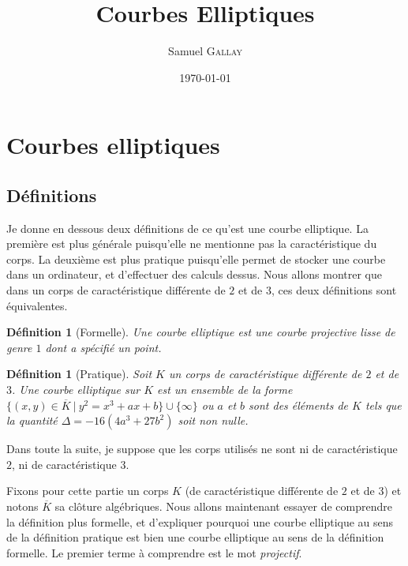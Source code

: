 \documentclass{article}
\title{Courbes Elliptiques}
\author{Samuel \textsc{Gallay}}
\date{\today}
\theoremstyle{plain}%
\newtheorem{deff}[thm]{Définition}
\theoremstyle{definition}%
\newcommand{\ol}{\overline}
\begin{document}
\maketitle





\section{Courbes elliptiques}

\subsection{Définitions}

Je donne en dessous deux définitions de ce qu'est une courbe elliptique. La première est plus générale puisqu'elle ne mentionne pas la  caractéristique du corps. La deuxième est plus pratique puisqu'elle permet de stocker une courbe dans un ordinateur, et d'effectuer des calculs dessus. Nous allons montrer que dans un corps de caractéristique différente de $2$ et de $3$, ces deux définitions sont équivalentes.

\begin{deff}[Formelle]
  Une courbe elliptique est une courbe projective lisse de genre $1$ dont a spécifié un point.
\end{deff}

\begin{deff}[Pratique]
  Soit $K$ un corps de caractéristique différente de $2$ et de $3$. Une courbe elliptique sur $K$ est un ensemble de la forme $\{(x, y)\in\ol K\ |\ y^2 = x^3 + ax +b\}\cup\{\infty\}$ ou $a$ et $b$ sont des éléments de $K$ tels que la quantité $\Delta =-16(4a^3+ 27b^2)$ soit non nulle.
\end{deff}

\begin{center}
  \color{red}
  Dans toute la suite, je suppose que les corps utilisés ne sont ni de caractéristique $2$, ni de caractéristique $3$.
\end{center}

Fixons pour cette partie un corps $K$ (de caractéristique différente de $2$ et de $3$) et notons $\overline{K}$ sa clôture algébriques. Nous allons maintenant essayer de comprendre la définition plus formelle, et d'expliquer pourquoi une courbe elliptique au sens de la définition pratique est bien une courbe elliptique au sens de la définition formelle. Le premier terme à comprendre est le mot \emph{projectif}.
\end{document}
